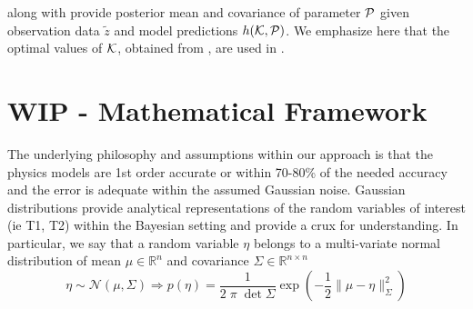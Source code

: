 \documentclass{article}         %
\theoremstyle{definition}
\theoremstyle{remark}
\begin{document}
 along with  provide posterior mean and covariance of parameter $\mathcal{P}$ given observation data $\tilde{z}$ and model predictions $h(\mathcal{K},\mathcal{P})$.
We emphasize here that the optimal values of $\mathcal{K}$, obtained from , are used in .

 

\section{ WIP - Mathematical Framework}\label{GeneralMathFramework}

The underlying philosophy and assumptions within our approach is that the physics 
models are 1st order accurate or within 70-80\% of the needed accuracy and the error is
adequate within the assumed Gaussian noise.
Gaussian distributions provide analytical representations of the random
variables of interest (ie T1, T2) within the Bayesian setting and 
provide a crux for understanding. In particular, we say that a random
variable $\eta$ belongs to a multi-variate normal distribution 
of mean $\mu \in \mathbb{R}^n $ and covariance $\Sigma \in \mathbb{R}^{n \times n}$
\[
     \eta \sim \mathcal{N}(\mu,\Sigma)  
    \Rightarrow
      p(\eta)  = \frac{1}{2 \; \pi \; \det{\Sigma}} \exp\left( - \frac{1}{2} \| \mu - \eta\|^2_{\Sigma}\right)
\]
\end{document}
